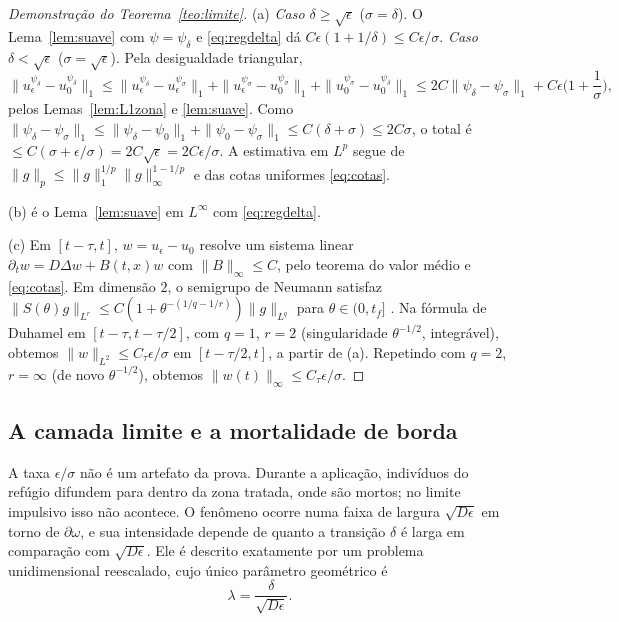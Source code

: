 \documentclass[11pt,a4paper]{article}
\numberwithin{equation}{section}
\theoremstyle{definition}
\theoremstyle{remark}
\begin{document}
\begin{proof}[Demonstração do Teorema~\ref{teo:limite}]
(a) \emph{Caso $\delta\ge\sqrt\epsilon$} ($\sigma=\delta$). O Lema~\ref{lem:suave} com $\psi=\psi_\delta$ e
\eqref{eq:regdelta} dá $C\epsilon(1+1/\delta)\le C\epsilon/\sigma$.
\emph{Caso $\delta<\sqrt\epsilon$} ($\sigma=\sqrt\epsilon$). Pela desigualdade triangular,
\[
\|u^{\psi_\delta}_\epsilon-u^{\psi_\delta}_0\|_1\le\|u^{\psi_\delta}_\epsilon-u^{\psi_\sigma}_\epsilon\|_1
+\|u^{\psi_\sigma}_\epsilon-u^{\psi_\sigma}_0\|_1+\|u^{\psi_\sigma}_0-u^{\psi_\delta}_0\|_1
\le 2C\|\psi_\delta-\psi_\sigma\|_1+C\epsilon\Big(1+\frac1\sigma\Big),
\]
pelos Lemas~\ref{lem:L1zona} e \ref{lem:suave}. Como
$\|\psi_\delta-\psi_\sigma\|_1\le\|\psi_\delta-\psi_0\|_1+\|\psi_0-\psi_\sigma\|_1\le C(\delta+\sigma)\le2C\sigma$,
o total é $\le C(\sigma+\epsilon/\sigma)=2C\sqrt\epsilon=2C\epsilon/\sigma$. A estimativa em $L^p$ segue de
$\|g\|_p\le\|g\|_1^{1/p}\|g\|_\infty^{1-1/p}$ e das cotas uniformes \eqref{eq:cotas}.

(b) é o Lema~\ref{lem:suave} em $L^\infty$ com \eqref{eq:regdelta}.

(c) Em $[t-\tau,t]$, $w=u_\epsilon-u_0$ resolve um sistema linear $\partial_tw=D\Delta w+B(t,x)w$ com
$\|B\|_\infty\le C$, pelo teorema do valor médio e \eqref{eq:cotas}. Em dimensão $2$, o semigrupo de
Neumann satisfaz $\|S(\theta)g\|_{L^r}\le C(1+\theta^{-(1/q-1/r)})\|g\|_{L^q}$ para
$\theta\in(0,t_f]$ \cite{QS}. Na fórmula de Duhamel em $[t-\tau,t-\tau/2]$, com $q=1$, $r=2$
(singularidade $\theta^{-1/2}$, integrável), obtemos $\|w\|_{L^2}\le C_\tau\epsilon/\sigma$ em
$[t-\tau/2,t]$, a partir de (a). Repetindo com $q=2$, $r=\infty$ (de novo $\theta^{-1/2}$), obtemos
$\|w(t)\|_\infty\le C_\tau\epsilon/\sigma$.
\end{proof}

\subsection{A camada limite e a mortalidade de borda}

A taxa $\epsilon/\sigma$ não é um artefato da prova. Durante a aplicação, indivíduos do refúgio
difundem para dentro da zona tratada, onde são mortos; no limite impulsivo isso não acontece. O
fenômeno ocorre numa faixa de largura $\sqrt{D\epsilon}$ em torno de $\partial\omega$, e sua intensidade
depende de quanto a transição $\delta$ é larga em comparação com $\sqrt{D\epsilon}$. Ele é descrito
exatamente por um problema unidimensional reescalado, cujo único parâmetro geométrico é
\[
\lambda=\frac{\delta}{\sqrt{D\epsilon}} .
\]
\end{document}
